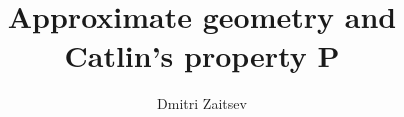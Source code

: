 \documentclass[12pt]{amsart}
\begin{document}

\def\1#1{\overline{#1}}
\def\2#1{\widetilde{#1}}
\def\3#1{\widehat{#1}}
\def\4#1{\mathbb{#1}}
\def\5#1{\frak{#1}}
\def\6#1{{\mathcal{#1}}}

\def\C{{\4C}}
\def\R{{\4R}}
\def\N{{\4N}}
\def\Z{{\4Z}}

\title[]{Approximate geometry and Catlin's property P}
\author[D. Zaitsev]{Dmitri Zaitsev}
\address{D. Zaitsev: School of Mathematics, Trinity College Dublin, Dublin 2, Ireland}

\maketitle
\tableofcontents


\def\Label#1{\label{#1}{\bf (#1)}~}




\def\cn{{\C^n}}
\def\cnn{{\C^{n'}}}
\def\ocn{\2{\C^n}}
\def\ocnn{\2{\C^{n'}}}


\def\dist{{\rm dist}}
\def\const{{\rm const}}
\def\rk{{\rm rank\,}}
\def\id{{\sf id}}
\def\aut{{\sf aut}}
\def\Aut{{\sf Aut}}
\def\CR{{\rm CR}}
\def\GL{{\sf GL}}
\def\Re{{\sf Re}\,}
\def\Im{{\sf Im}\,}
\def\span{\text{\rm span}}


\def\codim{{\rm codim}}
\def\crd{\dim_{{\rm CR}}}
\def\crc{{\rm codim_{CR}}}

\def\phi{\varphi}
\def\e{\varepsilon}
\def\eps{\varepsilon}
\def\d{\partial}
\def\a{\alpha}
\def\b{\beta}
\def\g{\gamma}
\def\G{\Gamma}
\def\D{\Delta}
\def\Om{\Omega}
\def\k{\kappa}
\def\l{\lambda}
\def\L{\Lambda}
\def\z{{\bar z}}
\def\w{{\bar w}}
\def\Z{{\1Z}}
\def\t{\tau}
\def\th{\theta}
\def\p{\phi}
\def\de{\delta}
\def\la{\langle}
\def\ra{\rangle}
\def\r{\rho}

\frenchspacing

\newtheorem{Thm}{Theorem}[section]
\newtheorem{Cor}[Thm]{Corollary}
\newtheorem{Pro}[Thm]{Proposition}
\newtheorem{Lem}[Thm]{Lemma}

\theoremstyle{definition}\newtheorem{Def}[Thm]{Definition}

\theoremstyle{remark}
\newtheorem{Rem}[Thm]{Remark}
\newtheorem{Exa}[Thm]{Example}
\newtheorem{Exs}[Thm]{Examples}
\end{document}
